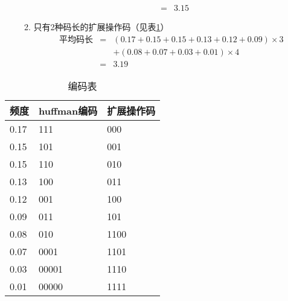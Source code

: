 \documentclass[11pt]{article}
\begin{document}
\begin{enumerate}
\begin{enumerate}
\begin{eqnarray*}
          &=& 3.15
        \end{eqnarray*}
      \item 
        只有2种码长的扩展操作码（见表\ref{tab: code}）
        \begin{eqnarray*}
          \text{平均码长} &=& (0.17 + 0.15 + 0.15 + 0.13 + 0.12 + 0.09) \times 3 \\
          && + (0.08 + 0.07 + 0.03 + 0.01) \times 4 \\
          &=& 3.19
        \end{eqnarray*}
    \end{enumerate}
\end{enumerate}

\begin{table}[htbp]
  \centering
  \begin{tabular}{lll}
    \hline
    频度 & huffman编码 & 扩展操作码 \\
    \hline
    0.17 & 111 & 000 \\
    0.15 & 101 & 001 \\
    0.15 & 110 & 010 \\
    0.13 & 100 & 011 \\
    0.12 & 001 & 100 \\
    0.09 & 011 & 101 \\
    \hline
    0.08 & 010 & 1100 \\
    0.07 & 0001 & 1101 \\
    0.03 & 00001 & 1110 \\
    0.01 & 00000 & 1111 \\
    \hline
  \end{tabular}
  \caption{编码表\label{tab: code}}
\end{table}
\end{document}
